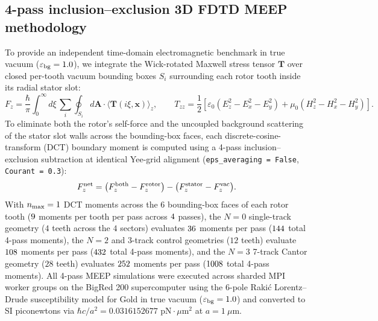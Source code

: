 \documentclass[11pt,letterpaper]{article}
\begin{document}
\subsection*{4-pass inclusion--exclusion 3D FDTD MEEP methodology}
To provide an independent time-domain electromagnetic benchmark in true vacuum ($\varepsilon_{\rm bg}=1.0$), we integrate the Wick-rotated Maxwell stress tensor $\mathbf{T}$ over closed per-tooth vacuum bounding boxes $S_i$ surrounding each rotor tooth inside its radial stator slot\cite{oskooi2010,rodriguez2011}:
\begin{equation}
F_z = \frac{\hbar}{\pi} \int_0^\infty d\xi \, \sum_{i} \oint_{S_i} d\mathbf{A} \cdot \langle \mathbf{T}(i\xi, \mathbf{x}) \rangle_z,
\qquad
T_{zz} = \frac{1}{2} \left[ \varepsilon_0 (E_z^2 - E_x^2 - E_y^2) + \mu_0 (H_z^2 - H_x^2 - H_y^2) \right].
\label{eq:methods_fdtd}
\end{equation}
To eliminate both the rotor's self-force and the uncoupled background scattering of the stator slot walls across the bounding-box faces, each discrete-cosine-transform (DCT) boundary moment is computed using a 4-pass inclusion--exclusion subtraction at identical Yee-grid alignment (\texttt{eps\_averaging = False}, \texttt{Courant = 0.3}):
\begin{equation}
F_z^{\rm net} = \bigl(F_z^{\rm both} - F_z^{\rm rotor}\bigr) - \bigl(F_z^{\rm stator} - F_z^{\rm vac}\bigr).
\label{eq:methods_four_pass}
\end{equation}
With $n_{\rm max}=1$ DCT moments across the $6$ bounding-box faces of each rotor tooth ($9{}$ moments per tooth per pass across $4{}$ passes), the $N=0$ single-track geometry ($4$ teeth across the $4$ sectors) evaluates $36{}$ moments per pass ($144{}$ total 4-pass moments), the $N=2$ and 3-track control geometries ($12$ teeth) evaluate $108{}$ moments per pass ($432{}$ total 4-pass moments), and the $N=3$ 7-track Cantor geometry ($28$ teeth) evaluates $252{}$ moments per pass ($1008{}$ total 4-pass moments). All 4-pass MEEP simulations were executed across sharded MPI worker groups on the BigRed 200 supercomputer using the 6-pole Raki\'c Lorentz--Drude susceptibility model for Gold in true vacuum ($\varepsilon_{\rm bg}=1.0$) and converted to SI piconewtons via $\hbar c / a^2 = 0.0316152677\text{ pN}\cdot\mu\text{m}^2$ at $a = 1\ \mu\text{m}$.
\end{document}
